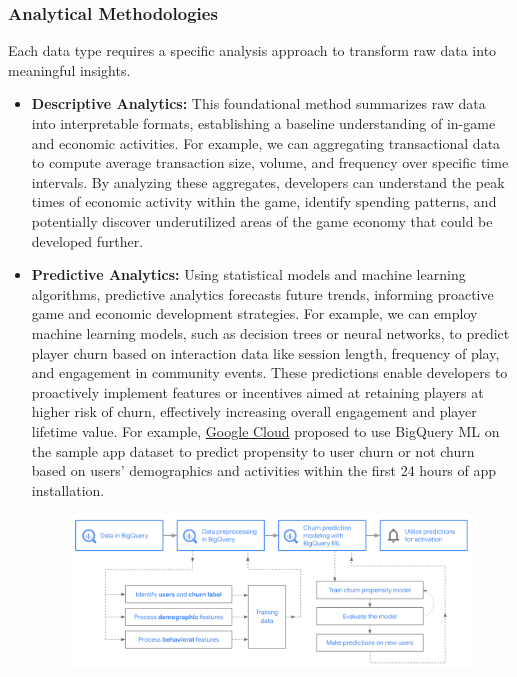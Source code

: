 \subsubsection{Analytical Methodologies}
Each data type requires a specific analysis approach to transform raw data into meaningful insights.
\begin{itemize}
    \item \textbf{Descriptive Analytics:}
This foundational method summarizes raw data into interpretable formats, establishing a baseline understanding of in-game and economic activities. For example, we can aggregating transactional data to compute average transaction size, volume, and frequency over specific time intervals. By analyzing these aggregates, developers can understand the peak times of economic activity within the game, identify spending patterns, and potentially discover underutilized areas of the game economy that could be developed further.
\item \textbf{Predictive Analytics:}
Using statistical models and machine learning algorithms, predictive analytics forecasts future trends, informing proactive game and economic development strategies. For example, we can employ machine learning models, such as decision trees or neural networks, to predict player churn based on interaction data like session length, frequency of play, and engagement in community events. These predictions enable developers to proactively implement features or incentives aimed at retaining players at higher risk of churn, effectively increasing overall engagement and player lifetime value. For example, \href{https://cloud.google.com/blog/topics/developers-practitioners/churn-prediction-game-developers-using-google-analytics-4-ga4-and-bigquery-ml}{Google Cloud} proposed to use BigQuery ML on the sample app dataset to predict propensity to user churn or not churn based on users' demographics and activities within the first 24 hours of app installation.
\begin{figure}[!htb]
    \centering
    \includegraphics[width=1\textwidth]{prediction.png}

\end{figure}
\end{itemize}
